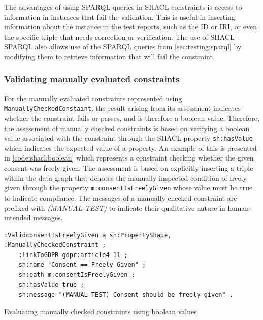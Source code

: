 The advantages of using SPARQL queries in SHACL constraints is access to information in instances that fail the validation. This is useful in inserting information about the instance in the test reports, such as the ID or IRI, or even the specific triple that needs correction or verification.
The use of SHACL-SPARQL also allows use of the SPARQL queries from \autoref{sec:testing:sparql} by modifying them to retrieve information that will fail the constraint.

\subsubsection{Validating manually evaluated constraints}
For the manually evaluated constraints represented using \texttt{ManuallyCheckedConstaint}, the result arising from its assessment indicates whether the constraint fails or passes, and is therefore a boolean value.
Therefore, the assessment of manually checked constraints is based on verifying a boolean value associated with the constraint through the SHACL property \texttt{sh:hasValue} which indicates the expected value of a property.
An example of this is presented in \autoref{code:shacl:boolean} which represents a constraint checking whether the given consent was freely given.
The assessment is based on explicitly inserting a triple within the data graph that denotes the manually inspected condition of freely given through the property \texttt{m:consentIsFreelyGiven} whose value must be true to indicate compliance.
The messages of a manually checked constraint are prefixed with \textit{(MANUAL-TEST)} to indicate their qualitative nature in human-intended messages.
\begin{listing}[htbp]
\begin{verbatim}
:ValidconsentIsFreelyGiven a sh:PropertyShape, :ManuallyCheckedConstraint ;
    :linkToGDPR gdpr:article4-11 ;
    sh:name "Consent == Freely Given" ;
    sh:path m:consentIsFreelyGiven ;
    sh:hasValue true ;
    sh:message "(MANUAL-TEST) Consent should be freely given" .
\end{verbatim}
\caption{Evaluating manually checked constraints using boolean values}
\label{code:shacl:boolean}
\end{listing}


